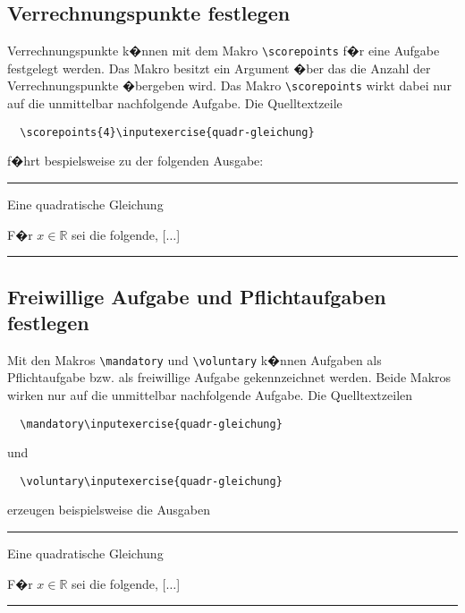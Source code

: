 \subsection{Verrechnungspunkte festlegen}
Verrechnungspunkte k�nnen mit dem Makro \verb|\scorepoints| f�r eine Aufgabe festgelegt werden. Das Makro besitzt ein Argument �ber das die Anzahl der Verrechnungspunkte �bergeben wird. Das Makro \verb|\scorepoints| wirkt dabei nur auf die unmittelbar nachfolgende Aufgabe. Die Quelltextzeile
\begin{verbatim}
  \scorepoints{4}\inputexercise{quadr-gleichung}
\end{verbatim}
f�hrt bespielsweise zu der folgenden Ausgabe:
\vspace*{2em}
\hrule
  \setcounter{exercise}{0}
  \nocontentsline
  \begin{exercise}{Eine quadratische Gleichung}
    \begin{body}
      F�r $x \in \mathbb{R}$ sei die folgende, [$\dotsc$]
    \end{body}
  \end{exercise}
\hrule
\vspace*{2em}



\subsection{Freiwillige Aufgabe und Pflichtaufgaben festlegen}
Mit den Makros \verb|\mandatory| und \verb|\voluntary| k�nnen Aufgaben als Pflichtaufgabe bzw. als freiwillige Aufgabe gekennzeichnet werden. Beide Makros wirken nur auf die unmittelbar nachfolgende Aufgabe. Die Quelltextzeilen
\begin{verbatim}
  \mandatory\inputexercise{quadr-gleichung}
\end{verbatim}
und 
\begin{verbatim}
  \voluntary\inputexercise{quadr-gleichung}
\end{verbatim}
erzeugen beispielsweise die Ausgaben
\vspace*{2em}
\hrule
  \setcounter{exercise}{0}
  \nocontentsline
  \mandatory
  \begin{exercise}{Eine quadratische Gleichung}
    \begin{body}
      F�r $x \in \mathbb{R}$ sei die folgende, [$\dotsc$]
    \end{body}
  \end{exercise}
\hrule
\vspace*{2em}

